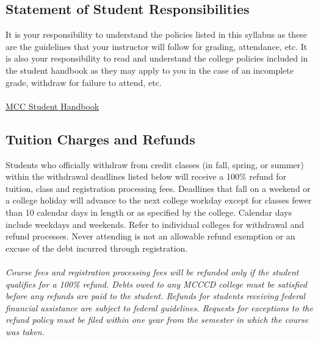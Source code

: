 \documentclass[12pt]{article}
\begin{document}
\subsection*{Statement of Student Responsibilities}
It is your responsibility to understand the policies listed in this syllabus as these are the guidelines that your instructor will follow for grading, attendance, etc.  It is also your responsibility to read and understand the college policies included in the student handbook as they may apply to you in the case of an incomplete grade, withdraw for failure to attend, etc.
\\~\\
\href{https://www.mesacc.edu/sites/default/files/pages/section/students/student-life/MCC\%20Student\%20Handbook\%202014-2015-web.pdf}{MCC Student Handbook}

\subsection*{Tuition Charges and Refunds}
Students who officially withdraw from credit classes (in fall, spring, or summer) within the withdrawal deadlines listed below will receive a 100\% refund for tuition, class and registration processing fees. Deadlines that fall on a weekend or a college holiday will advance to the next college workday except for classes fewer than 10 calendar days in length or as specified by the college. Calendar days include weekdays and weekends. Refer to individual colleges for withdrawal and refund processes. Never attending is not an allowable refund exemption or an excuse of the debt incurred through registration.
\\~\\
{\it *Course fees and registration processing fees will be refunded only if the student qualifies for a 100\% refund. Debts owed to any MCCCD college must be satisfied before any refunds are paid to the student. Refunds for students receiving federal financial assistance are subject to federal guidelines. Requests for exceptions to the refund policy must be filed within one year from the semester in which the course was taken.}

\newpage
\end{document}
